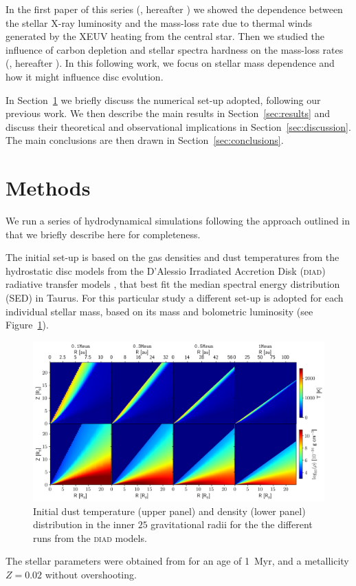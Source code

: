 \documentclass[usenatbib,useAMS,usedcolumn]{mnras}
\begin{document}
In the first paper of this series (, hereafter ) we showed the dependence between the stellar X-ray luminosity and the mass-loss rate due to thermal winds generated by the XEUV heating from the central star. Then we studied the influence of carbon depletion  and stellar spectra hardness on the mass-loss rates (, hereafter ). In this following work, we focus on stellar mass dependence and how it might influence disc evolution.

In Section~\ref{sec:methods} we briefly discuss the numerical set-up adopted, following our previous work. We then describe the main results in Section~\ref{sec:results} and discuss their theoretical and observational implications in Section~\ref{sec:discussion}. The main conclusions are then drawn in Section~\ref{sec:conclusions}.

\section{Methods}\label{sec:methods}
We run a series of hydrodynamical simulations following the approach outlined in  that we briefly describe here for completeness.

The initial set-up is based on the gas densities and dust temperatures from the hydrostatic disc models from the D’Alessio Irradiated Accretion Disk (\textsc{diad}) radiative transfer models , that best fit the median spectral energy distribution (SED) in Taurus. 
For this particular study a different set-up is adopted for each individual stellar mass, based on its mass and bolometric luminosity (see Figure~\ref{fig:initdiscs}).
\begin{figure}
    \centering
    \includegraphics[width=\textwidth]{Figure1}
    \caption{Initial dust temperature (upper panel) and density (lower panel) distribution in the inner $25$ gravitational radii for the the different runs from the \textsc{diad} models. \label{fig:initdiscs}}
\end{figure}
The stellar parameters were obtained from  for an age of \SI{1}{Myr}, and a metallicity $Z=0.02$ without overshooting.
\end{document}
